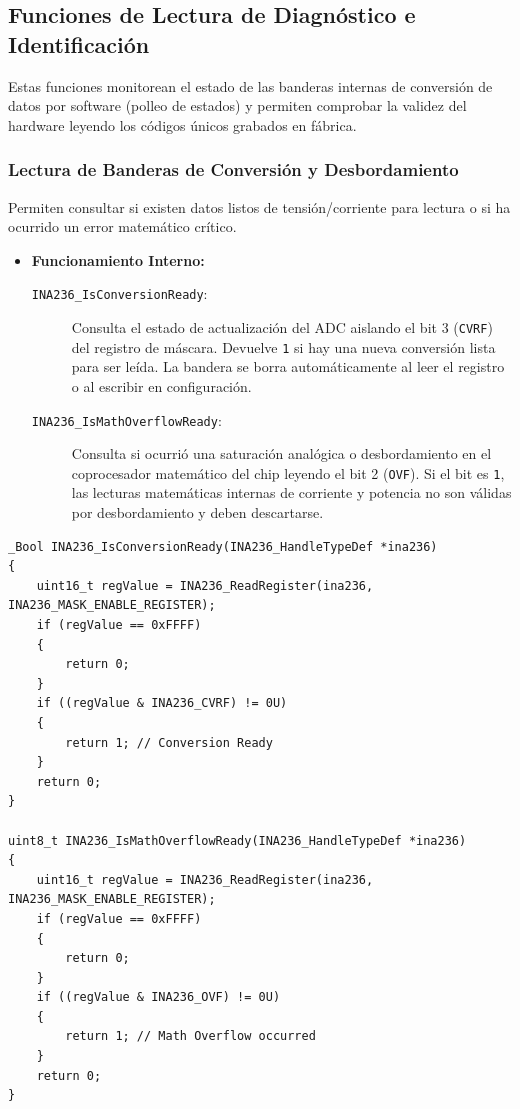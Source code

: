 \documentclass[
10pt, %
a4paper, %
oneside, %
headinclude,footinclude, %
BCOR5mm, %
]{scrartcl}
\begin{document}
\subsection{Funciones de Lectura de Diagnóstico e Identificación}
Estas funciones monitorean el estado de las banderas internas de conversión de datos por software (polleo de estados) y permiten comprobar la validez del hardware leyendo los códigos únicos grabados en fábrica.

\subsubsection{Lectura de Banderas de Conversión y Desbordamiento}
Permiten consultar si existen datos listos de tensión/corriente para lectura o si ha ocurrido un error matemático crítico.

\begin{itemize}
	\item \textbf{Funcionamiento Interno:}
		\begin{description}
			\item[\texttt{INA236\_IsConversionReady}:] Consulta el estado de actualización del ADC aislando el bit 3 (\texttt{CVRF}) del registro de máscara. Devuelve \texttt{1} si hay una nueva conversión lista para ser leída. La bandera se borra automáticamente al leer el registro o al escribir en configuración.
			\item[\texttt{INA236\_IsMathOverflowReady}:] Consulta si ocurrió una saturación analógica o desbordamiento en el coprocesador matemático del chip leyendo el bit 2 (\texttt{OVF}). Si el bit es \texttt{1}, las lecturas matemáticas internas de corriente y potencia no son válidas por desbordamiento y deben descartarse.
		\end{description}
\end{itemize}

\begin{lstlisting}[style=CMakeStyle]
_Bool INA236_IsConversionReady(INA236_HandleTypeDef *ina236)
{
    uint16_t regValue = INA236_ReadRegister(ina236, INA236_MASK_ENABLE_REGISTER);
    if (regValue == 0xFFFF)
    {
        return 0;
    }
    if ((regValue & INA236_CVRF) != 0U)
    {
        return 1; // Conversion Ready
    }
    return 0;
}

uint8_t INA236_IsMathOverflowReady(INA236_HandleTypeDef *ina236)
{
    uint16_t regValue = INA236_ReadRegister(ina236, INA236_MASK_ENABLE_REGISTER);
    if (regValue == 0xFFFF)
    {
        return 0;
    }
    if ((regValue & INA236_OVF) != 0U)
    {
        return 1; // Math Overflow occurred
    }
    return 0;
}
\end{lstlisting}
\end{document}
